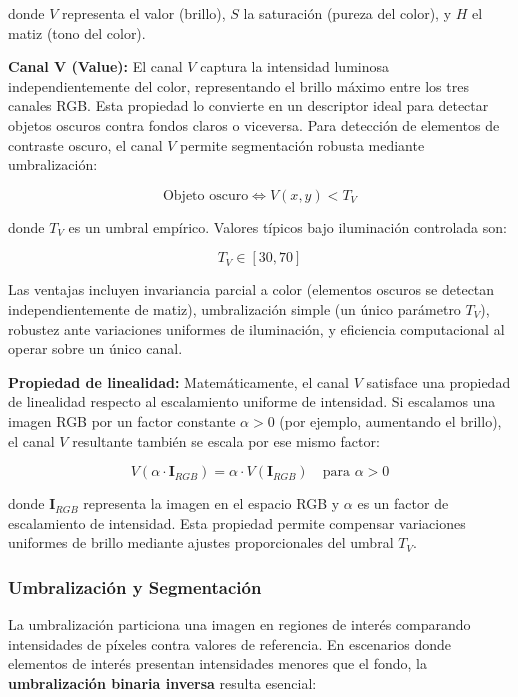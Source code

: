 donde $V$ representa el valor (brillo), $S$ la saturación (pureza del color), y $H$ el matiz (tono del color).

\textbf{Canal V (Value):} El canal $V$ captura la intensidad luminosa independientemente del color, representando el brillo máximo entre los tres canales RGB. Esta propiedad lo convierte en un descriptor ideal para detectar objetos oscuros contra fondos claros o viceversa. Para detección de elementos de contraste oscuro, el canal $V$ permite segmentación robusta mediante umbralización:

\begin{equation}
\text{Objeto oscuro} \Leftrightarrow V(x,y) < T_V
\end{equation}

donde $T_V$ es un umbral empírico. Valores típicos bajo iluminación controlada son:

\begin{equation}
T_V \in [30, 70]
\end{equation}

Las ventajas incluyen invariancia parcial a color (elementos oscuros se detectan independientemente de matiz), umbralización simple (un único parámetro $T_V$), robustez ante variaciones uniformes de iluminación, y eficiencia computacional al operar sobre un único canal.

\textbf{Propiedad de linealidad:} Matemáticamente, el canal $V$ satisface una propiedad de linealidad respecto al escalamiento uniforme de intensidad. Si escalamos una imagen RGB por un factor constante $\alpha > 0$ (por ejemplo, aumentando el brillo), el canal $V$ resultante también se escala por ese mismo factor:

\begin{equation}
V(\alpha \cdot \mathbf{I}_{RGB}) = \alpha \cdot V(\mathbf{I}_{RGB}) \quad \text{para } \alpha > 0
\end{equation}

donde $\mathbf{I}_{RGB}$ representa la imagen en el espacio RGB y $\alpha$ es un factor de escalamiento de intensidad. Esta propiedad permite compensar variaciones uniformes de brillo mediante ajustes proporcionales del umbral $T_V$.

\subsubsection{Umbralización y Segmentación}

La umbralización particiona una imagen en regiones de interés comparando intensidades de píxeles contra valores de referencia. En escenarios donde elementos de interés presentan intensidades menores que el fondo, la \textbf{umbralización binaria inversa} resulta esencial:


